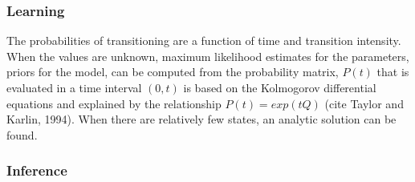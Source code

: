\subsubsection{Learning}
The probabilities of transitioning are a function of time and transition intensity.  When the values are unknown, maximum likelihood estimates for the parameters, priors for the model, can be computed from the probability matrix, $P(t)$ that is evaluated in a time interval $(0,t)$ is based on the Kolmogorov differential equations and explained by the relationship $P(t)= exp(tQ)$ (cite Taylor and Karlin, 1994).  When there are relatively few states, an analytic solution can be found.  


\subsubsection{Inference}

